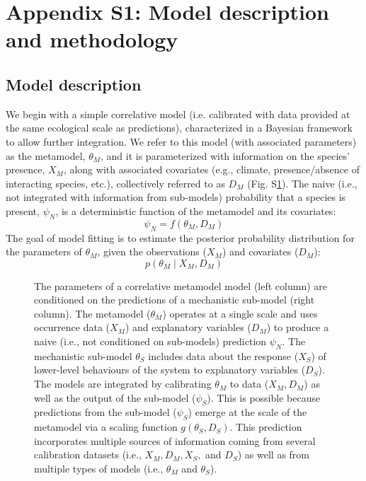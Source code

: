 \documentclass[11pt]{article}
\begin{document}
\section*{Appendix S1: Model description and methodology}
\subsection*{Model description}

We begin with a simple correlative model (i.e. calibrated with data provided at the same ecological scale as predictions), characterized in a Bayesian framework to allow further integration. 
We refer to this model (with associated parameters) as the metamodel, \(\theta_M\), and it is parameterized with information on the species' presence, \(X_M\), along with associated covariates (e.g., climate, presence/absence of interacting species, etc.), collectively referred to as \(D_M\) (Fig. S\ref{fig:diagram}). 
The naive (i.e., not integrated with information from sub-models) probability that a species is present, \(\psi_N\), is a deterministic function of the metamodel and its covariates:
\begin{equation}
\label{eq:sdm1}
	\psi_N = f(\theta_M, D_M)
\end{equation}
The goal of model fitting is to estimate the posterior probability distribution for the parameters of \(\theta_M\), given the observations (\(X_M\)) and covariates (\(D_M\)):
\begin{equation}
\label{eq:sdm2}
	p( \theta_M \mid X_M, D_M)
\end{equation}

\begin{figure}[t]

\caption{The parameters of a correlative metamodel model (left column) are conditioned on the predictions of a mechanistic sub-model (right column).
	The metamodel ($\theta_M$) operates at a single scale and uses occurrence data (\(X_M\)) and explanatory variables ($D_M$) to produce a naive (i.e., not conditioned on sub-models) prediction $\psi_N$.
	The mechanistic sub-model \(\theta_S\) includes data about the response (\(X_S\)) of lower-level behaviours of the system to explanatory variables ($D_S$). 
	The models are integrated by calibrating $\theta_M$ to data ($X_M, D_M$) as well as the output of the sub-model ($\psi_S$). 
	This is possible because predictions from the sub-model ($\psi_S$) emerge at the scale of the metamodel via a scaling function \(g(\theta_S, D_S)\).
	This prediction incorporates multiple sources of information coming from several calibration datasets (i.e., $X_M, D_M, X_S, $ and $D_S$) as well as from multiple types of models (i.e., $\theta_M$ and $\theta_S$).}
\label{fig:diagram}
\end{figure}
\end{document}
